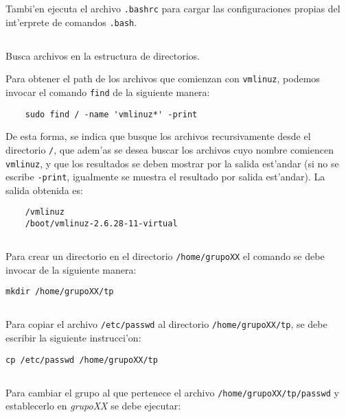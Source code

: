 Tambi'en ejecuta el archivo \texttt{.bashrc} para cargar las configuraciones propias del int'erprete de comandos \texttt{.bash}.

\subsection{}
Busca archivos en la estructura de directorios.

Para obtener el path de los archivos que comienzan con \texttt{vmlinuz}, podemos invocar el comando \texttt{find} de la siguiente manera:
      \begin{mylisting}
      \begin{verbatim}
	sudo find / -name 'vmlinuz*' -print
      \end{verbatim}
      \end{mylisting}
De esta forma, se indica que busque los archivos recursivamente desde el directorio \texttt{/}, que adem'as se desea buscar los archivos cuyo nombre comiencen \texttt{vmlinuz}, y que los resultados se deben mostrar por la salida est'andar (si no se escribe \texttt{-print}, igualmente se muestra el resultado por salida est'andar).
La salida obtenida es:
      \begin{mylisting}
      \begin{verbatim}
	/vmlinuz
	/boot/vmlinuz-2.6.28-11-virtual
      \end{verbatim}
      \end{mylisting}

\subsection{}
Para crear un directorio en el directorio \texttt{/home/grupoXX} el comando se debe invocar de la siguiente manera:

\texttt{mkdir /home/grupoXX/tp}

\subsection{}
Para copiar el archivo \texttt{/etc/passwd} al directorio \texttt{/home/grupoXX/tp}, se debe escribir la siguiente instrucci'on:

\texttt{cp /etc/passwd /home/grupoXX/tp}

\subsection{}
Para cambiar el grupo al que pertenece el archivo \texttt{/home/grupoXX/tp/passwd} y establecerlo en \emph{grupoXX} se debe ejecutar:


